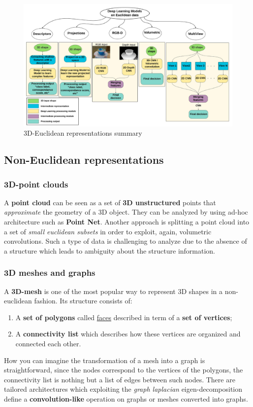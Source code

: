 \begin{figure}
    \centering
    \includegraphics[scale=0.65]{img/EuclideanSummary.png}
    \caption{3D-Euclidean representations summary}
\end{figure}

\subsection{Non-Euclidean representations}
 
\subsubsection{3D-point clouds}
A \textbf{point cloud} can be seen as a set of \textbf{3D unstructured} points that \textit{approximate} the geometry of a 3D object. They can be analyzed by using ad-hoc architecture such as \textbf{Point Net}. Another approach is splitting a point cloud into a set of \textit{small  euclidean subsets} in order to exploit, again, volumetric convolutions.
Such a type of data is challenging to analyze due to the absence of a structure which leads to ambiguity about the structure information.

\subsubsection{3D meshes and graphs}
A \textbf{3D-mesh} is one of the most popular way to represent 3D shapes in a non-euclidean fashion. Its structure consists of:
\begin{enumerate}
    \itemsep-0.3em
    \item A \textbf{set of polygons} called \underline{faces} described in term of a \textbf{set of vertices}; 
    \item A \textbf{connectivity list} which describes how these vertices are organized and connected each other.
\end{enumerate}
How you can imagine the transformation of a mesh into a graph is straightforward, since the nodes correspond to the vertices of the polygons, the connectivity list is nothing but a list of edges between such nodes. There are tailored architectures which exploiting the \textit{graph laplacian} eigen-decomposition define a \textbf{convolution-like} operation on graphs or meshes converted into graphs.

